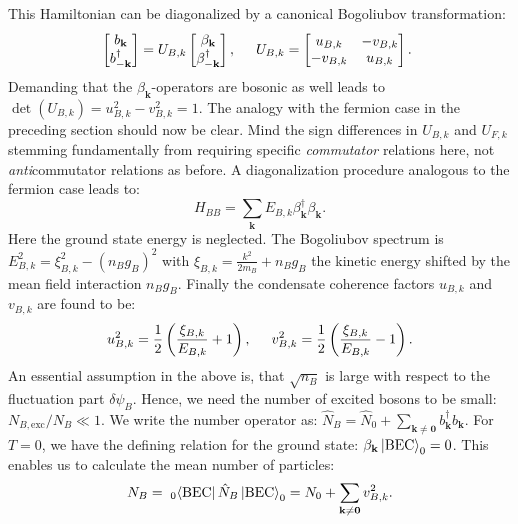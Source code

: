 This Hamiltonian can be diagonalized by a canonical Bogoliubov transformation:
\begin{equation}
\begin{bmatrix} b_\mathbf{k} \\ b^\dagger_{-\mathbf{k}} \end{bmatrix} = U_{B,k} \begin{bmatrix} \beta_\mathbf{k} \\ \beta^\dagger_{-\mathbf{k}}\end{bmatrix}, \hspace{0.5cm} U_{B,k} = \begin{bmatrix} u_{B,k} & -v_{B,k} \\ -v_{B,k} & u_{B,k} \end{bmatrix}. 
\end{equation}
Demanding that the $\beta_\mathbf{k}$-operators are bosonic as well leads to $\det(U_{B,k}) = u_{B,k}^2-v_{B,k}^2 = 1$. The analogy with the fermion case in the preceding section should now be clear. Mind the sign differences in $U_{B,k}$ and $U_{F,k}$ stemming fundamentally from requiring specific \textit{commutator} relations here, not \textit{anti}commutator relations as before. A diagonalization procedure analogous to the fermion case leads to: 
\begin{equation}
H_{BB} = \sum_\mathbf{k} E_{B,k} \beta_\mathbf{k}^\dagger \beta_\mathbf{k}. 
\end{equation}
Here the ground state energy is neglected. The Bogoliubov spectrum is $E_{B,k}^2 = \xi_{B,k}^2-(n_Bg_B)^2$ with $\xi_{B,k} = \frac{k^2}{2m_B}+n_Bg_B$ the kinetic energy shifted by the mean field interaction $n_Bg_B$. Finally the condensate coherence factors $u_{B,k}$ and $v_{B,k}$ are found to be: 
\begin{equation}
u_{B,k}^2 = \frac{1}{2}\left(\frac{\xi_{B,k}}{ E_{B,k}}+1 \right), \hspace{0.5cm} v_{B,k}^2 = \frac{1}{2}\left(\frac{\xi_{B,k}}{ E_{B,k}}-1 \right).
\end{equation}
An essential assumption in the above is, that $\sqrt{n_B}$ is large with respect to the fluctuation part $\delta\psi_B$. Hence, we need the number of excited bosons to be small: $N_{B,\text{exc}}/ N_B \ll 1$. We write the number operator as: $\hat{N}_B = \hat{N}_0 + \sum_{\mathbf{k}\neq \mathbf{0}} b^\dagger_{\mathbf{k}}b_{\mathbf{k}}$. For $T = 0$, we have the defining relation for the ground state: $\beta_{\mathbf{k}}\ket{\text{BEC}}_0 = 0$. This enables us to calculate the mean number of particles:
\begin{equation}
N_B =\;_{0}\!\bra{\text{BEC}} \hat{N}_B \ket{\text{BEC}}_0 = N_0 + \sum_{\mathbf{k}\neq \mathbf{0}} v^2_{B,k}.\nonumber
\end{equation} 
